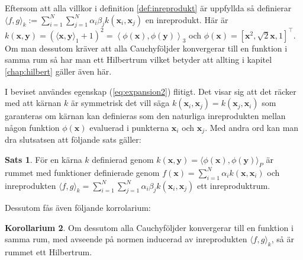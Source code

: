 \documentclass[a4paper, 12pt]{report}
\theoremstyle{definition}
\newtheorem{thm}{Sats}[section]
\newtheorem{cor}[thm]{Korollarium}
\theoremstyle{remark}
\newcommand{\bfx}{\mathbf{x}}
\newcommand{\bfy}{\mathbf{y}}
\begin{document}
\begin{enumerate}

\end{enumerate}
Eftersom att alla villkor i definition \ref{def:inreprodukt} är uppfyllda så definierar $\langle f, g\rangle_k:=\sum_{i=1}^{N}\sum_{j=1}^{N}\alpha_i\beta_jk\left(\bfx_i,\bfx_j\right)$ en inreprodukt. Här är $k\left(\bfx, \bfy\right)=\left(\langle \bfx, \bfy\rangle_1 + 1\right)^2= \left\langle \phi\left(\bfx\right), \phi\left(\bfy\right)\right\rangle_3$ och $\phi\left(\bfx\right)=\left[\bfx^2, \sqrt{2}\bfx, 1 \right]^\intercal$. Om man dessutom kräver att alla Cauchyföljder konvergerar till en funktion i samma rum så har man ett Hilbertrum vilket betyder att allting i kapitel \ref{chap:hilbert} gäller även här.

I beviset användes egenskap (\ref{eq:expansion2}) flitigt. Det visar sig att det räcker med att kärnan $k$ är symmetrisk det vill säga $k\left(\bfx_i,\bfx_j\right)=k\left(\bfx_j,\bfx_i\right)$ som garanteras om kärnan kan definieras som den naturliga inreprodukten mellan någon funktion $\phi\left(\mathbf{x}\right)$ evaluerad i punkterna $\bfx_i$ och $\bfx_j$. Med andra ord kan man dra slutsatsen att följande sats gäller:
\begin{thm}\label{thm:kärnainreprodukt}
	För en kärna $k$ definierad genom $k\left(\bfx, \bfy\right)=\langle \phi\left(\bfx\right), \phi\left(\bfy\right)\rangle_P$ är rummet med funktioner definierade genom $f\left(\bfx\right) = \sum_{i=1}^{N}\alpha_ik\left(\bfx, \bfx_i\right)$ och inreprodukten $\langle f,g\rangle_k = \sum_{i=1}^{N}\sum_{j=1}^{N} \alpha_i\beta_jk\left(\bfx_i,\bfx_j\right)$ ett inreproduktrum.
\end{thm}
Dessutom fås även följande korrolarium:
\begin{cor}\label{cor:kärnahilbert}
	Om dessutom alla Cauchyföljder konvergerar till en funktion i samma rum, med avseende på normen inducerad av inreprodukten $\langle f, g\rangle_k$, så är rummet ett Hilbertrum.
\end{cor}
\end{document}
